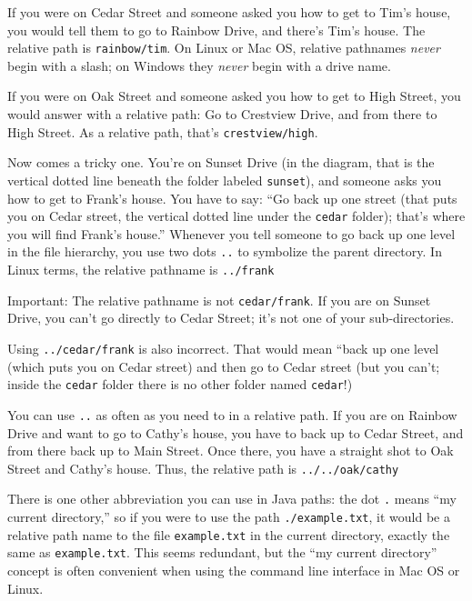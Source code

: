If you were on Cedar Street and someone asked you how to get to Tim's house, you would tell them to go to Rainbow Drive, and there's Tim's house. The relative path is \texttt{rainbow/tim}. On Linux or Mac OS, relative pathnames {\em never} begin with a slash; on Windows they {\em never} begin with a drive name.

If you were on Oak Street and someone asked you how to get to High Street, you would answer with a relative path: Go to Crestview Drive, and from there to High Street. As a relative path, that's \texttt{crestview/high}.

Now comes a tricky one. You're on Sunset Drive (in the diagram, that is the vertical dotted line beneath the folder labeled \texttt{sunset}), and someone asks you how to get to Frank's house. You have to say: ``Go back up one street (that puts you on Cedar street, the vertical dotted line under the \texttt{cedar} folder); that's where you will find Frank's house.'' Whenever you tell someone to go back up one level in the file hierarchy, you use two dots \texttt{..} to symbolize the parent directory. In Linux terms, the relative pathname is \texttt{../frank}

Important: The relative pathname is not \texttt{cedar/frank}. If you are on Sunset Drive, you can't go directly to Cedar Street; it's not one of your sub-directories.

Using \texttt{../cedar/frank} is also incorrect. That would mean ``back up one level (which puts you on Cedar street) and then go to Cedar street (but you can't; inside the \texttt{cedar} folder there is no other folder named \texttt{cedar}!)

You can use \texttt{..} as often as you need to in a relative path. If you are on Rainbow Drive and want to go to Cathy's house, you have to back up to Cedar Street, and from there back up to Main Street. Once there, you have a straight shot to Oak Street and Cathy's house. Thus, the relative path is \texttt{../../oak/cathy}

There is one other abbreviation you can use in Java paths: the dot \texttt{.} means ``my current directory,'' so if you were to use the path \texttt{./example.txt}, it would be a relative path name to the file \texttt{example.txt} in the current directory, exactly the same as \texttt{example.txt}. This seems redundant, but the ``my current directory'' concept is often convenient when using the command line interface in Mac OS or Linux. 
